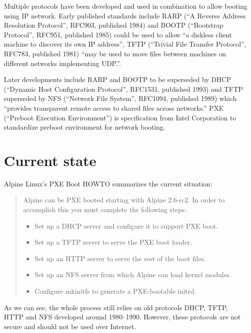 Multiple protocols have been developed and used in combination to
allow booting using IP network. Early published standards include RARP
(``A Reverse Address Resolution Protocol'', RFC903, published
1984\cite{RFC903}) and BOOTP (``Bootstrap Protocol'', RFC951,
published 1985\cite{RFC951}) could be used to allow ``a diskless
client machine to discover its own IP address''\cite{RFC951}, TFTP
(``Trivial File Transfer Protocol'', RFC783, published
1981\cite{RFC783}) ``may be used to move files between machines on
different networks implementing UDP.''\cite{RFC783}.

Later developments include RARP and BOOTP to be superseded by DHCP
(``Dynamic Host Configuration Protocol'', RFC1531, published
1993\cite{RFC1531}) and TFTP superseded by NFS (``Network File
System'', RFC1094, published 1989\cite{RFC1094}) which ``provides
transparent remote access to shared files across
networks.''\cite{RFC1094} PXE (``Preboot Execution
Environment''\cite{PXEspec}) is specification from Intel Corporation
to standardize preboot environment for network booting.


\section{Current state}

Alpine Linux's PXE Boot HOWTO\cite{alpine-pxe-boot-howto} summarizes
the current situation:

\begin{quote}
Alpine can be PXE booted starting with Alpine 2.6-rc2. In order to
accomplish this you must complete the following steps:

\begin{itemize}
\item Set up a DHCP server and configure it to support PXE boot.
\item Set up a TFTP server to serve the PXE boot loader.
\item Set up an HTTP server to serve the rest of the boot files.
\item Set up an NFS server from which Alpine can load kernel modules.
\item Configure mkinitfs to generate a PXE-bootable initrd.
\end{itemize}
\end{quote}

As we can see, the whole process still relies on old protocols DHCP,
TFTP, HTTP and NFS developed around 1980--1990. However, these
protocols are not secure and should not be used over Internet.

